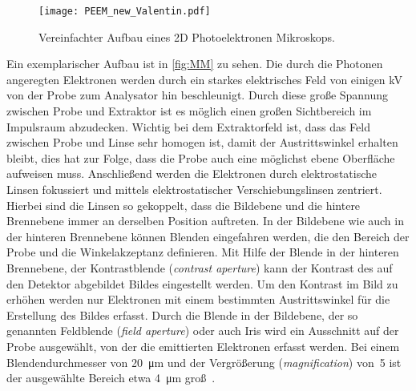         \begin{figure}
            \centering
            \texttt{[image: PEEM\_new\_Valentin.pdf]}
            \caption{Vereinfachter Aufbau eines 2D Photoelektronen Mikroskops.} 
            \label{fig:MM}
        \end{figure}
        Ein exemplarischer Aufbau ist in \autoref{fig:MM} zu sehen.
        Die durch die Photonen angeregten Elektronen werden durch ein starkes elektrisches Feld von einigen \si{\kilo\volt} von der Probe zum Analysator hin beschleunigt.
        Durch diese große Spannung zwischen Probe und Extraktor ist es möglich einen großen Sichtbereich im Impulsraum abzudecken.
        Wichtig bei dem Extraktorfeld ist, dass das Feld zwischen Probe und Linse sehr homogen ist, damit der Austrittswinkel erhalten bleibt, dies hat zur Folge, dass die Probe auch eine möglichst ebene Oberfläche aufweisen muss.
        Anschließend werden die Elektronen durch elektrostatische Linsen fokussiert und mittels elektrostatischer Verschiebungslinsen zentriert.
        Hierbei sind die Linsen so gekoppelt, dass die Bildebene und die hintere Brennebene immer an derselben Position auftreten.
        In der Bildebene wie auch in der hinteren Brennebene können Blenden eingefahren werden, die den Bereich der Probe und die Winkelakzeptanz definieren.
        Mit Hilfe der Blende in der hinteren Brennebene, der Kontrastblende (\textit{contrast aperture}) kann der Kontrast des auf den Detektor abgebildet Bildes eingestellt werden.
        Um den Kontrast im Bild zu erhöhen werden nur Elektronen mit einem bestimmten Austrittswinkel für die Erstellung des Bildes erfasst.
        Durch die Blende in der Bildebene, der so genannten Feldblende (\textit{field aperture}) oder auch Iris wird ein Ausschnitt auf der Probe ausgewählt, von der die emittierten Elektronen erfasst werden.
        Bei einem Blendendurchmesser von \SI{20}{\micro\meter} und der Vergrößerung (\textit{magnification}) von~\num{5} ist der ausgewählte Bereich etwa \SI{4}{\micro\meter} groß~\cite{SPECS-MM}.

